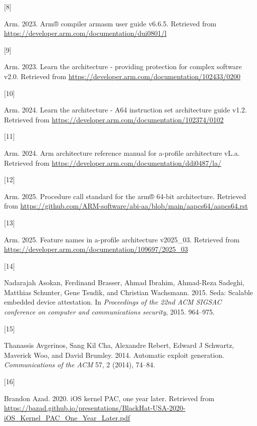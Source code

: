 \documentclass[a4paper, nobind]{templates/ociamthesis}
\newlength{\cslhangindent}
\newlength{\csllabelwidth}
\newenvironment{CSLReferences}[2] %
{\begin{list}{}{%
	\setlength{\itemindent}{0pt}
	\setlength{\leftmargin}{0pt}
	\setlength{\parsep}{0pt}
	\ifodd #1
	\setlength{\leftmargin}{\cslhangindent}
	\setlength{\itemindent}{-1\cslhangindent}
	\fi
	\setlength{\itemsep}{#2\baselineskip}}}
{\end{list}}
\newcommand{\CSLLeftMargin}[1]{\parbox[t]{\csllabelwidth}{\strut#1\strut}}
\newcommand{\CSLRightInline}[1]{\parbox[t]{\linewidth - \csllabelwidth}{\strut#1\strut}}
\begin{document}
\begin{CSLReferences}{0}{0}
\CSLLeftMargin{{[}8{]} }%
\CSLRightInline{Arm. 2023. Arm® compiler armasm user guide v6.6.5. Retrieved from \url{https://developer.arm.com/documentation/dui0801/l}}

\CSLLeftMargin{{[}9{]} }%
\CSLRightInline{Arm. 2023. Learn the architecture - providing protection for complex software v2.0. Retrieved from \url{https://developer.arm.com/documentation/102433/0200}}

\CSLLeftMargin{{[}10{]} }%
\CSLRightInline{Arm. 2024. Learn the architecture - A64 instruction set architecture guide v1.2. Retrieved from \url{https://developer.arm.com/documentation/102374/0102}}

\CSLLeftMargin{{[}11{]} }%
\CSLRightInline{Arm. 2024. Arm architecture reference manual for a-profile architecture vL.a. Retrieved from \url{https://developer.arm.com/documentation/ddi0487/la/}}

\CSLLeftMargin{{[}12{]} }%
\CSLRightInline{Arm. 2025. Procedure call standard for the arm® 64-bit architecture. Retrieved from \url{https://github.com/ARM-software/abi-aa/blob/main/aapcs64/aapcs64.rst}}

\CSLLeftMargin{{[}13{]} }%
\CSLRightInline{Arm. 2025. Feature names in a-profile architecture v2025\_03. Retrieved from \url{https://developer.arm.com/documentation/109697/2025_03}}

\CSLLeftMargin{{[}14{]} }%
\CSLRightInline{Nadarajah Asokan, Ferdinand Brasser, Ahmad Ibrahim, Ahmad-Reza Sadeghi, Matthias Schunter, Gene Tsudik, and Christian Wachsmann. 2015. Seda: Scalable embedded device attestation. In \emph{Proceedings of the 22nd ACM SIGSAC conference on computer and communications security}, 2015. 964--975.}

\CSLLeftMargin{{[}15{]} }%
\CSLRightInline{Thanassis Avgerinos, Sang Kil Cha, Alexandre Rebert, Edward J Schwartz, Maverick Woo, and David Brumley. 2014. Automatic exploit generation. \emph{Communications of the ACM} 57, 2 (2014), 74--84.}

\CSLLeftMargin{{[}16{]} }%
\CSLRightInline{Brandon Azad. 2020. iOS kernel PAC, one year later. Retrieved from \url{https://bazad.github.io/presentations/BlackHat-USA-2020-iOS_Kernel_PAC_One_Year_Later.pdf}}


\end{CSLReferences}
\end{document}
